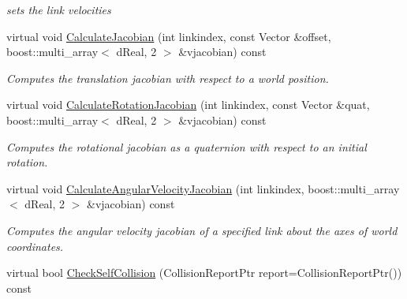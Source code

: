 \begin{DoxyCompactItemize}
\begin{DoxyCompactList}\small\item\em sets the link velocities \item\end{DoxyCompactList}\item 
virtual void \hyperlink{classOpenRAVE_1_1KinBody_a7fd6178241c4b8c8bb8a9d9b5f92f8cc}{CalculateJacobian} (int linkindex, const Vector \&offset, boost::multi\_\-array$<$ dReal, 2 $>$ \&vjacobian) const 
\begin{DoxyCompactList}\small\item\em Computes the translation jacobian with respect to a world position. \item\end{DoxyCompactList}\item 
virtual void \hyperlink{classOpenRAVE_1_1KinBody_a4223d26feefc25a2d8b7e0abdb30e551}{CalculateRotationJacobian} (int linkindex, const Vector \&quat, boost::multi\_\-array$<$ dReal, 2 $>$ \&vjacobian) const 
\begin{DoxyCompactList}\small\item\em Computes the rotational jacobian as a quaternion with respect to an initial rotation. \item\end{DoxyCompactList}\item 
virtual void \hyperlink{classOpenRAVE_1_1KinBody_a48eef419ccc30bfcdd82febedd6f54b7}{CalculateAngularVelocityJacobian} (int linkindex, boost::multi\_\-array$<$ dReal, 2 $>$ \&vjacobian) const 
\begin{DoxyCompactList}\small\item\em Computes the angular velocity jacobian of a specified link about the axes of world coordinates. \item\end{DoxyCompactList}\item 
\hypertarget{classOpenRAVE_1_1KinBody_a3d555222cf7b02d592a0a31cef5d479d}{
virtual bool \hyperlink{classOpenRAVE_1_1KinBody_a3d555222cf7b02d592a0a31cef5d479d}{CheckSelfCollision} (CollisionReportPtr report=CollisionReportPtr()) const }
\label{classOpenRAVE_1_1KinBody_a3d555222cf7b02d592a0a31cef5d479d}


\end{DoxyCompactItemize}
